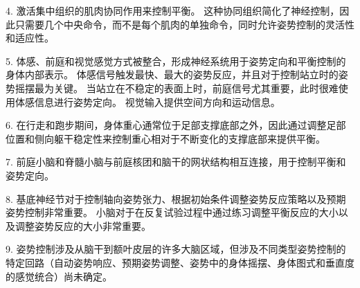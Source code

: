 4. 激活集中组织的肌肉协同作用来控制平衡。
这种协同组织简化了神经控制，因此只需要几个中央命令，而不是每个肌肉的单独命令，同时允许姿势控制的灵活性和适应性。


5. 体感、前庭和视觉感觉方式被整合，形成神经系统用于姿势定向和平衡控制的身体内部表示。
体感信号触发最快、最大的姿势反应，并且对于控制站立时的姿势摇摆最为关键。
当站立在不稳定的表面上时，前庭信号尤其重要，此时很难使用体感信息进行姿势定向。
视觉输入提供空间方向和运动信息。


6. 在行走和跑步期间，身体重心通常位于足部支撑底部之外，因此通过调整足部位置和侧向躯干稳定性来控制重心相对于不断变化的支撑底部来提供平衡。


7. 前庭小脑和脊髓小脑与前庭核团和脑干的网状结构相互连接，用于控制平衡和姿势定向。


8. 基底神经节对于控制轴向姿势张力、根据初始条件调整姿势反应策略以及预期姿势控制非常重要。
小脑对于在反复试验过程中通过练习调整平衡反应的大小以及调整姿势反应的大小非常重要。


9. 姿势控制涉及从脑干到额叶皮层的许多大脑区域，但涉及不同类型姿势控制的特定回路（自动姿势响应、预期姿势调整、姿势中的身体摇摆、身体图式和垂直度的感觉统合）尚未确定。

